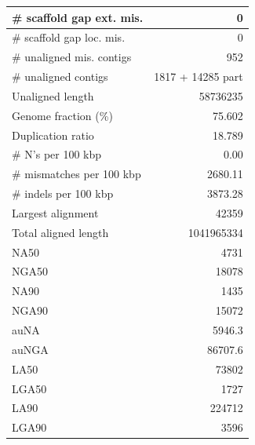 \documentclass[12pt,a4paper]{article}
\begin{document}
\begin{table}[ht]
\begin{center}
\begin{tabular}{|l*{1}{|r}|}
\# scaffold gap ext. mis. & 0 \\ \hline
\# scaffold gap loc. mis. & 0 \\ \hline
\# unaligned mis. contigs & 952 \\ \hline
\# unaligned contigs & 1817 + 14285 part \\ \hline
Unaligned length & 58736235 \\ \hline
Genome fraction (\%) & 75.602 \\ \hline
Duplication ratio & 18.789 \\ \hline
\# N's per 100 kbp & 0.00 \\ \hline
\# mismatches per 100 kbp & 2680.11 \\ \hline
\# indels per 100 kbp & 3873.28 \\ \hline
Largest alignment & 42359 \\ \hline
Total aligned length & 1041965334 \\ \hline
NA50 & 4731 \\ \hline
NGA50 & 18078 \\ \hline
NA90 & 1435 \\ \hline
NGA90 & 15072 \\ \hline
auNA & 5946.3 \\ \hline
auNGA & 86707.6 \\ \hline
LA50 & 73802 \\ \hline
LGA50 & 1727 \\ \hline
LA90 & 224712 \\ \hline
LGA90 & 3596 \\ \hline
\end{tabular}
\end{center}
\end{table}
\end{document}
